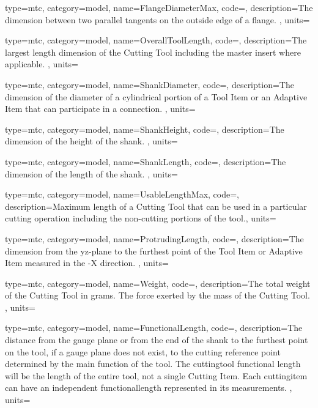 {
  type=mtc,
  category=model,
  name={FlangeDiameterMax},
  code=,
  description={The dimension between two parallel tangents on the outside edge of a flange. },
  units=
}


{
  type=mtc,
  category=model,
  name={OverallToolLength},
  code=,
  description={The largest length dimension of the Cutting Tool including the master insert where applicable.  },
  units=
}


{
  type=mtc,
  category=model,
  name={ShankDiameter},
  code=,
  description={The dimension of the diameter of a cylindrical portion of a Tool Item or an Adaptive Item that can participate in a connection. },
  units=
}


{
  type=mtc,
  category=model,
  name={ShankHeight},
  code=,
  description={The dimension of the height of the shank. },
  units=
}


{
  type=mtc,
  category=model,
  name={ShankLength},
  code=,
  description={The dimension of the length of the shank. },
  units=
}


{
  type=mtc,
  category=model,
  name={UsableLengthMax},
  code=,
  description={Maximum length of a Cutting Tool that can be used in a particular cutting operation including the non-cutting portions of the tool.},
  units=
}


{
  type=mtc,
  category=model,
  name={ProtrudingLength},
  code=,
  description={The dimension from the yz-plane to the furthest point of the Tool Item or Adaptive Item measured in the -X direction. },
  units=
}


{
  type=mtc,
  category=model,
  name={Weight},
  code=,
  description={The total weight of the Cutting Tool in grams. The force exerted by the mass of the Cutting Tool. },
  units=
}


{
  type=mtc,
  category=model,
  name={FunctionalLength},
  code=,
  description={The distance from the gauge plane or from the end of the shank to the furthest point on the tool, if a gauge plane does not exist, to the cutting reference point determined by the main function of the tool. The \gls{cuttingtool} functional length will be the length of the entire tool, not a single Cutting Item. Each \gls{cuttingitem} can have an independent \gls{functionallength} represented in its measurements. },
  units=
}


